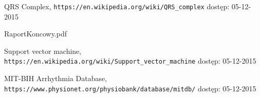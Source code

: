 
\begin{thebibliography}{99} %

 
QRS Complex,
\newblock \texttt{https://en.wikipedia.org/wiki/QRS\_complex}
\newblock dostęp: 05-12-2015

RaportKoncowy.pdf


Support vector machine,
\newblock \texttt{https://en.wikipedia.org/wiki/Support\_vector\_machine}
\newblock dostęp: 05-12-2015


MIT-BIH Arrhythmia Database,
\newblock \texttt{https://www.physionet.org/physiobank/database/mitdb/}
\newblock dostęp: 05-12-2015



\end{thebibliography}